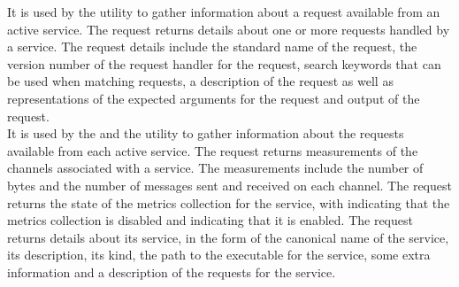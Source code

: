 It is used by the  utility to gather information about a
request available from an active service.
The  request returns details about one or more requests
handled by a service.
The request details include the standard name of the request, the version number of the
request handler for the request, search keywords that can be used when matching requests,
a description of the request as well as representations of the expected arguments for the
request and output of the request.\\

It is used by the  and the
 utility to gather information about the requests available
from each active service.
The  request returns measurements of the channels
associated with a service.
The measurements include the number of bytes and the number of messages sent and
received on each channel.
The  request returns the state of the metrics
collection for the service, with  indicating that the metrics collection is
disabled and  indicating that it is enabled.
The  request returns details about its service, in the
form of the canonical name of the service, its description, its kind, the path to the
executable for the service, some extra information and a description of the requests for
the service.\\

